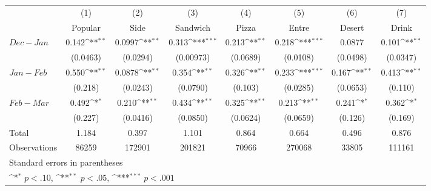 {
\def\sym#1{\ifmmode^{#1}\else\(^{#1}\)\fi}
\begin{tabular}{l*{7}{c}}
\hline\hline
                    &\multicolumn{1}{c}{(1)}&\multicolumn{1}{c}{(2)}&\multicolumn{1}{c}{(3)}&\multicolumn{1}{c}{(4)}&\multicolumn{1}{c}{(5)}&\multicolumn{1}{c}{(6)}&\multicolumn{1}{c}{(7)}\\
                    &\multicolumn{1}{c}{Popular}&\multicolumn{1}{c}{Side}&\multicolumn{1}{c}{Sandwich}&\multicolumn{1}{c}{Pizza}&\multicolumn{1}{c}{Entre}&\multicolumn{1}{c}{Desert}&\multicolumn{1}{c}{Drink}\\
\hline
$Dec - Jan$&       0.142\sym{**} &      0.0997\sym{**} &       0.313\sym{***}&       0.213\sym{**} &       0.218\sym{***}&      0.0877         &       0.101\sym{**} \\
                    &    (0.0463)         &    (0.0294)         &   (0.00973)         &    (0.0689)         &    (0.0108)         &    (0.0498)         &    (0.0347)         \\
[1em]
$Jan - Feb$&       0.550\sym{**} &      0.0878\sym{**} &       0.354\sym{**} &       0.326\sym{**} &       0.233\sym{***}&       0.167\sym{**} &       0.413\sym{**} \\
                    &     (0.218)         &    (0.0243)         &    (0.0790)         &     (0.103)         &    (0.0285)         &    (0.0653)         &     (0.110)         \\
[1em]
$Feb - Mar$&       0.492\sym{*}  &       0.210\sym{**} &       0.434\sym{**} &       0.325\sym{**} &       0.213\sym{**} &       0.241\sym{*}  &       0.362\sym{*}  \\
                    &     (0.227)         &    (0.0416)         &    (0.0850)         &    (0.0624)         &    (0.0659)         &     (0.126)         &     (0.169)         \\
\hline
Total & 1.184 & 0.397 & 1.101 & 0.864 & 0.664 & 0.496 & 0.876 \\
Observations        &       86259         &      172901         &      201821         &       70966         &      270068         &       33805         &      111161         \\
\hline\hline
\multicolumn{8}{l}{\footnotesize Standard errors in parentheses}\\
\multicolumn{8}{l}{\footnotesize \sym{*} \(p<.10\), \sym{**} \(p<.05\), \sym{***} \(p<.001\)}\\
\end{tabular}
}
